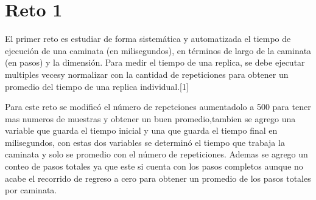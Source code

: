 \documentclass{article}
\begin{document}
\section{Reto 1}

El primer reto es estudiar de forma sistemática y automatizada el tiempo de ejecución de una caminata (en milisegundos), en términos de largo de la caminata (en pasos) y la dimensión. Para medir el tiempo de una replica, se debe ejecutar multiples vecesy normalizar con la cantidad de repeticiones para obtener un promedio del tiempo de una replica individual.[1]

Para este reto se modificó el número de repetciones aumentadolo a 500 para tener mas numeros de muestras y obtener un buen promedio,tambien se agrego una variable que guarda el tiempo inicial y una que guarda el tiempo final en milisegundos, con estas dos variables se determinó el tiempo que trabaja la caminata y solo se promedio con el número de repeticiones.
Ademas se agrego un conteo de pasos totales ya que este si cuenta con los pasos completos aunque no acabe el recorrido de regreso a cero para obtener un promedio de los pasos totales por caminata.
\end{document}
